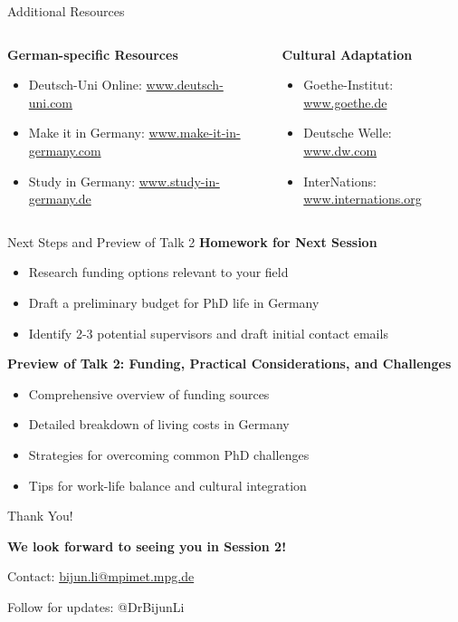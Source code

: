 \documentclass[aspectratio=169,10pt]{beamer}
\begin{document}
\begin{frame}{Additional Resources}
\begin{columns}[T]
    \begin{column}{0.5\textwidth}
        \textbf{German-specific Resources}
        \begin{itemize}
            \item Deutsch-Uni Online: \url{www.deutsch-uni.com}
            \item Make it in Germany: \url{www.make-it-in-germany.com}
            \item Study in Germany: \url{www.study-in-germany.de}
        \end{itemize}
    \end{column}
    \begin{column}{0.5\textwidth}
        \textbf{Cultural Adaptation}
        \begin{itemize}
            \item Goethe-Institut: \url{www.goethe.de}
            \item Deutsche Welle: \url{www.dw.com}
            \item InterNations: \url{www.internations.org}
        \end{itemize}
    \end{column}
\end{columns}
\end{frame}

\begin{frame}{Next Steps and Preview of Talk 2}
\textbf{Homework for Next Session}
\begin{itemize}
    \item Research funding options relevant to your field
    \item Draft a preliminary budget for PhD life in Germany
    \item Identify 2-3 potential supervisors and draft initial contact emails
\end{itemize}

\vspace{0.5cm}

\textbf{Preview of Talk 2: Funding, Practical Considerations, and Challenges}
\begin{itemize}
    \item Comprehensive overview of funding sources
    \item Detailed breakdown of living costs in Germany
    \item Strategies for overcoming common PhD challenges
    \item Tips for work-life balance and cultural integration
\end{itemize}
\end{frame}

\begin{frame}{Thank You!}
\begin{center}
\large{\textbf{We look forward to seeing you in Session 2!}}

\vspace{1cm}

Contact: \href{mailto:bijun.li@mpimet.mpg.de}{bijun.li@mpimet.mpg.de}

Follow for updates: @DrBijunLi
\end{center}
\end{frame}
\end{document}
